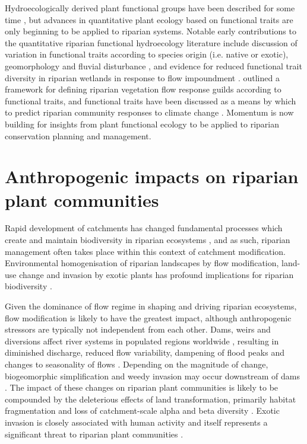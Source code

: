 Hydroecologically derived plant functional groups have been described for some time \citep{Stromberg2010, Casanova2011}, but advances in quantitative plant ecology based on functional traits are only beginning to be applied to riparian systems. Notable early contributions to the quantitative riparian functional hydroecology literature include discussion of variation in functional traits according to species origin (i.e. native or exotic), geomorphology and fluvial disturbance \citep{Kyle2009, Kyle2009a}, and evidence for reduced functional trait diversity in riparian wetlands in response to flow impoundment \citep{Catford2011}. \citet{Merritt2010b} outlined a framework for defining riparian vegetation flow response guilds according to functional traits, and functional traits have been discussed as a means by which to predict riparian community responses to climate change \citep{Catford2012a, Kominoski2013}. Momentum is now building for insights from plant functional ecology to be applied to riparian conservation planning and management.

\section{Anthropogenic impacts on riparian plant communities}
Rapid development of catchments has changed fundamental processes which create and maintain biodiversity in riparian ecosystems \citep{Nilsson2002}, and as such, riparian management often takes place within this context of catchment modification. Environmental homogenisation of riparian landscapes by flow modification, land-use change and invasion by exotic plants has profound implications for riparian biodiversity \citep{Brierley1999, Richardson2007, poff2007homogenization}. 

Given the dominance of flow regime in shaping and driving riparian ecosystems, flow modification is likely to have the greatest impact, although anthropogenic stressors are typically not independent from each other. Dams, weirs and diversions affect river systems in populated regions worldwide \citep{Nilsson2002}, resulting in diminished discharge, reduced flow variability, dampening of flood peaks and changes to seasonality of flows \citep{Graf2006, Singer2007}. Depending on the magnitude of change, biogeomorphic simplification and weedy invasion may occur downstream of dams \citep{Graf2006, Naiman2008, Catford2011}. The impact of these changes on riparian plant communities is likely to be compounded by the deleterious effects of land transformation, primarily habitat fragmentation and loss of catchment-scale alpha and beta diversity \citep{Vitousek1997, Gerstner2014}. Exotic invasion is closely associated with human activity \citep{Vitousek1996} and itself represents a significant threat to riparian plant communities \citep{Richardson2007, Stromberg2007}.

